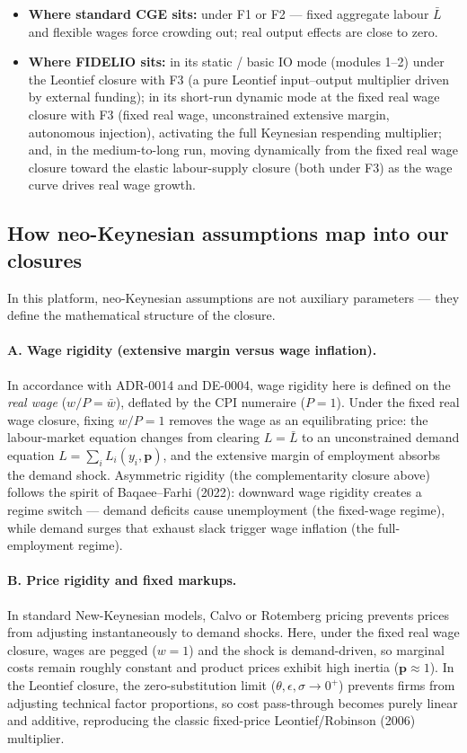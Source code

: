 \begin{itemize}
\item \textbf{Where standard CGE sits:} under F1 or F2 --- fixed
  aggregate labour $\bar L$ and flexible wages force crowding out; real output
  effects are close to zero.
\item \textbf{Where FIDELIO sits:} in its static / basic IO mode (modules
  1--2) under the Leontief closure with F3 (a pure Leontief input--output
  multiplier driven by
  external funding); in its short-run dynamic mode at the fixed real wage
  closure with F3 (fixed real
  wage, unconstrained extensive margin, autonomous injection), activating the
  full Keynesian respending multiplier; and, in the medium-to-long run, moving
  dynamically from the fixed real wage closure toward the elastic
  labour-supply closure (both under F3) as the wage curve drives real wage
  growth.
\end{itemize}

\subsection{How neo-Keynesian assumptions map into our closures}\label{app:neokeynesian}

In this platform, neo-Keynesian assumptions are not auxiliary parameters ---
they define the mathematical structure of the closure.

\paragraph{A. Wage rigidity (extensive margin versus wage inflation).}
In accordance with ADR-0014 and DE-0004, wage rigidity here is defined on the
\emph{real wage} ($w/P = \bar w$), deflated by the CPI numeraire ($P = 1$).
Under the fixed real wage closure, fixing $w/P = 1$ removes the wage as an
equilibrating price: the
labour-market equation changes from clearing $L = \bar L$ to an unconstrained
demand equation $L = \sum_i L_i(y_i, \mathbf{p})$, and the extensive margin of
employment absorbs the demand shock. Asymmetric rigidity (the complementarity
closure above) follows the
spirit of Baqaee--Farhi (2022): downward wage rigidity creates a regime
switch --- demand deficits cause unemployment (the fixed-wage regime), while
demand
surges that exhaust slack trigger wage inflation (the full-employment regime).

\paragraph{B. Price rigidity and fixed markups.} In standard New-Keynesian
models, Calvo or Rotemberg pricing prevents prices from adjusting
instantaneously to demand shocks. Here, under the fixed real wage closure,
wages are pegged
($w = 1$) and the shock is demand-driven, so marginal costs remain roughly
constant and product prices exhibit high inertia ($\mathbf{p} \approx 1$). In
the Leontief closure, the zero-substitution limit
($\theta, \epsilon, \sigma \to 0^+$)
prevents firms from adjusting technical factor proportions, so cost
pass-through becomes purely linear and additive, reproducing the classic
fixed-price Leontief/Robinson (2006) multiplier.

